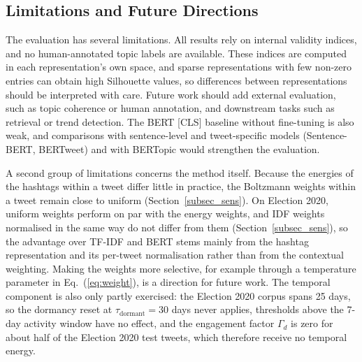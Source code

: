 \documentclass[pdflatex,sn-mathphys-num]{sn-jnl}%
\begin{document}
\subsection{Limitations and Future Directions}\label{subsec29}

The evaluation has several limitations. All results rely on internal validity indices, and no human-annotated topic labels are available. These indices are computed in each representation's own space, and sparse representations with few non-zero entries can obtain high Silhouette values, so differences between representations should be interpreted with care. Future work should add external evaluation, such as topic coherence or human annotation, and downstream tasks such as retrieval or trend detection. The BERT [CLS] baseline without fine-tuning is also weak, and comparisons with sentence-level and tweet-specific models (Sentence-BERT, BERTweet) and with BERTopic would strengthen the evaluation.

A second group of limitations concerns the method itself. Because the energies of the hashtags within a tweet differ little in practice, the Boltzmann weights within a tweet remain close to uniform (Section~\ref{subsec_sens}). On Election 2020, uniform weights perform on par with the energy weights, and IDF weights normalised in the same way do not differ from them (Section~\ref{subsec_sens}), so the advantage over TF-IDF and BERT stems mainly from the hashtag representation and its per-tweet normalisation rather than from the contextual weighting. Making the weights more selective, for example through a temperature parameter in Eq.~(\ref{eq:weight}), is a direction for future work. The temporal component is also only partly exercised: the Election 2020 corpus spans 25 days, so the dormancy reset at $\tau_{\text{dormant}} = 30$ days never applies, thresholds above the 7-day activity window have no effect, and the engagement factor $\Gamma_d$ is zero for about half of the Election 2020 test tweets, which therefore receive no temporal energy.
\end{document}
